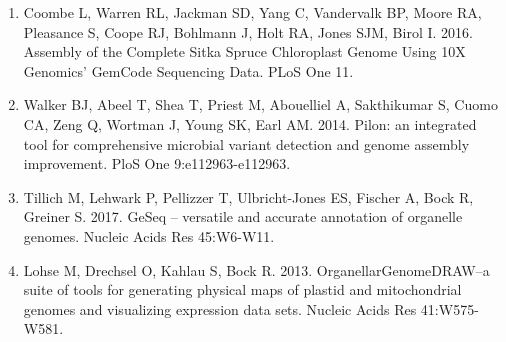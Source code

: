 \documentclass[titlepage,11pt, oneside]{article}   	%
\begin{document}
\begin{enumerate}
\item Coombe L, Warren RL, Jackman SD, Yang C, Vandervalk BP, Moore RA, Pleasance S, Coope RJ, Bohlmann J, Holt RA, Jones SJM, Birol I. 2016. Assembly of the Complete Sitka Spruce Chloroplast Genome Using 10X Genomics’ GemCode Sequencing Data. PLoS One 11.
\item Walker BJ, Abeel T, Shea T, Priest M, Abouelliel A, Sakthikumar S, Cuomo CA, Zeng Q, Wortman J, Young SK, Earl AM. 2014. Pilon: an integrated tool for comprehensive microbial variant detection and genome assembly improvement. PloS One 9:e112963-e112963.
\item Tillich M, Lehwark P, Pellizzer T, Ulbricht-Jones ES, Fischer A, Bock R, Greiner S. 2017. GeSeq – versatile and accurate annotation of organelle genomes. Nucleic Acids Res 45:W6-W11.
\item Lohse M, Drechsel O, Kahlau S, Bock R. 2013. OrganellarGenomeDRAW--a suite of tools for generating physical maps of plastid and mitochondrial genomes and visualizing expression data sets. Nucleic Acids Res 41:W575-W581.
\end{enumerate}
\end{document}
